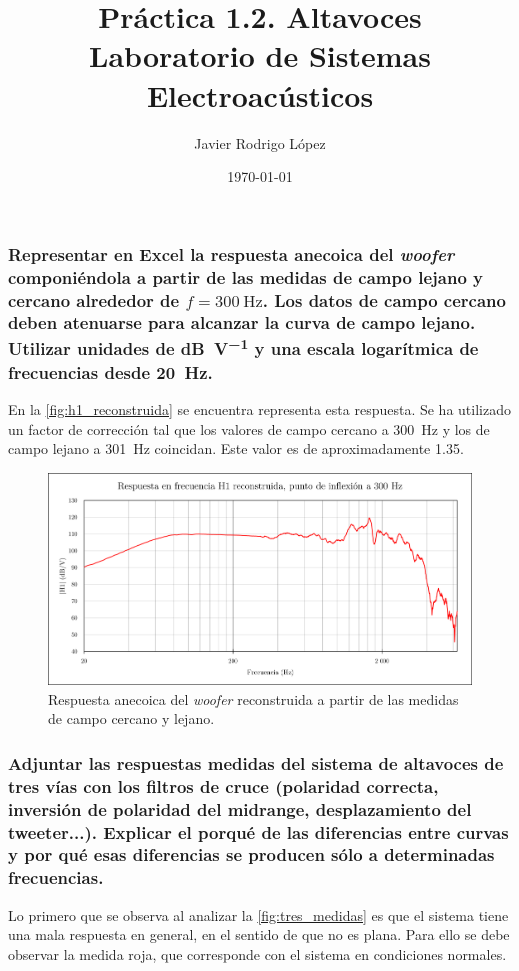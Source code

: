 \documentclass[10pt]{article}
\title{\Huge Práctica 1.2. Altavoces \\\huge Laboratorio de Sistemas Electroacústicos}
\author{Javier Rodrigo López}
\date{\today}
\begin{document}
\maketitle

\subsubsection{Representar en Excel la respuesta anecoica del \textit{woofer} componiéndola a partir de las medidas de campo lejano y cercano alrededor de $f=\qty{300}{\hertz }$. Los datos de campo cercano deben atenuarse para alcanzar la curva de campo lejano. Utilizar unidades de \unit{\dB\per\volt} y una escala logarítmica de frecuencias desde \qty{20}{\hertz}.}

En la \autoref{fig:h1_reconstruida} se encuentra representa esta respuesta. Se ha utilizado un factor de corrección tal que los valores de campo cercano a \qty{300}{\hertz } y los de campo lejano a \qty{301}{\hertz } coincidan. Este valor es de aproximadamente \num{1.35}.

\begin{figure}[htp]
  \centering
  \includegraphics[width=0.8\linewidth]{h1_reconstruida.png}
  \caption{Respuesta anecoica del \textit{woofer} reconstruida a partir de las medidas de campo cercano y lejano.}
  \label{fig:h1_reconstruida}
\end{figure}

\subsubsection{Adjuntar las respuestas medidas del sistema de altavoces de tres vías con los filtros de cruce (polaridad correcta, inversión de polaridad del midrange, desplazamiento del tweeter...). Explicar el porqué de las diferencias entre curvas y por qué esas diferencias se producen sólo a determinadas frecuencias.}

Lo primero que se observa al analizar la \autoref{fig:tres_medidas} es que el sistema tiene una mala respuesta en general, en el sentido de que no es plana. Para ello se debe observar la medida roja, que corresponde con el sistema en condiciones normales.
\end{document}
